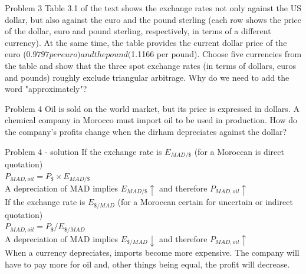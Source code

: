 \documentclass[12pt,aspectratio=169]{beamer}
\newcommand{\red}{\color{blue}}
\newcommand{\bla}{\color{black}}
\newif\ifshowsolution
\begin{document}
\begin{frame}{Problem 3}
Table 3.1 of the text shows the exchange rates not only against the US dollar, but also against the euro and the pound sterling (each row shows the price of the dollar, euro and pound sterling, respectively, in terms of a different currency). At the same time, the table provides the current dollar price of the euro ($0.9797 per euro) and the pound ($1.1166 per pound). Choose five currencies from the table and show that the three spot exchange rates (in terms of dollars, euros and pounds) roughly exclude triangular arbitrage. Why do we need to add the word "approximately"?
\end{frame}

\ifshowsolution
\begin{frame}{Problem 3 - solution}
	Perform the calculations shown in the solution to the previous problem to perform the required verification. Note that the table in the twelfth Italian edition has errors in the column headers.

The verification produces approximate values because the second strategy precedes two conversions and consequently higher costs.

\end{frame}
\fi

\begin{frame}{Problem 4}
Oil is sold on the world market, but its price is expressed in dollars. A chemical company in Morocco must import oil to be used in production. How do the company's profits change when the dirham depreciates against the dollar?
\end{frame}

\ifshowsolution
\begin{frame}{Problem 4 - solution}
	If the exchange rate is $E_{MAD/\$}$ (for a Moroccan is direct quotation)\\ $P_{MAD,oil}=P_{\$}\times E_{MAD/\$}$ \\A depreciation of MAD implies $E_{MAD/\$}\uparrow$ and therefore $P_{MAD,oil} \uparrow$ \\ If the exchange rate is $E_{\$/MAD}$ (for a Moroccan certain for uncertain or indirect quotation)\\ $P_{MAD, oil}=P_{\$}/ E_{\$/MAD}$ \\A depreciation of MAD implies $E_{\$/MAD}\downarrow$ and therefore $P_{MAD, oil} \uparrow$ \\ \red When a currency depreciates, imports become more expensive. The company will have to pay more for oil and, other things being equal, the profit will decrease. \bla
		

\end{frame}
\end{document}
